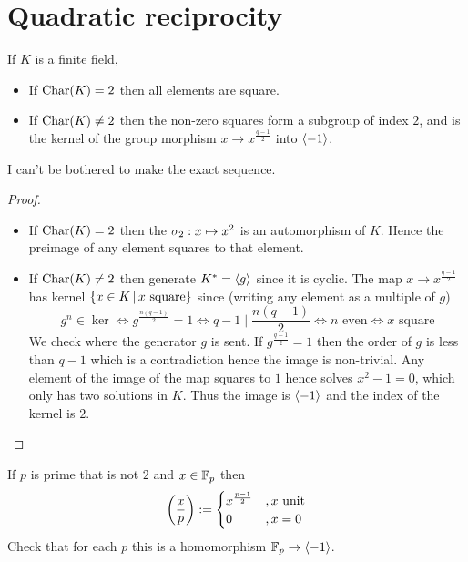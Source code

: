 \section{Quadratic reciprocity}
\begin{prop}
    If $K$ is a finite field,
    \begin{itemize}
        \item If $\mathrm{Char}(K) = 2$ then all elements are square.
        \item If $\mathrm{Char}(K) \ne 2$ 
        then the non-zero squares form a subgroup of index $2$,
        and is the kernel of the group morphism 
        $x \to x^{\frac{q-1}{2}}$ into $\langle-1\rangle$.
    \end{itemize}
    I can't be bothered to make the exact sequence.%
\end{prop}
\begin{proof}~
    \begin{itemize}
        \item If $\mathrm{Char}(K) = 2$ then the 
         $\sigma_2 : x \mapsto x^2$
        is an automorphism of $K$. 
        Hence the preimage of any element squares to that element.
        \item If $\mathrm{Char}(K) \ne 2$ then generate $K^* = \langle g\rangle$ 
        since it is cyclic.
        The map $x \to x^{\frac{q-1}{2}}$ 
        has kernel $\left\{x \in K \,|\, x \text{ square}\right\}$ since
        (writing any element as a multiple of $g$)
        \[
            g^n \in \ker \iff g^\frac{n(q-1)}{2} = 1 \iff 
            q - 1 \mid \frac{n(q - 1)}{2} \iff n \text{ even} 
            \iff x \text{ square}
        \]
        We check where the generator $g$ is sent. 
        If $g^{\frac{q - 1}{2}} = 1$ then the order of $g$ 
        is less than $q - 1$ which is a contradiction
        hence the image is non-trivial.
        Any element of the image of the map squares to $1$
        hence solves $x^2 - 1 = 0$,
        which only has two solutions in $K$.
        Thus the image is $\langle-1\rangle$ and the index of the kernel is $2$.
    \end{itemize}
\end{proof}

\begin{dfn}
    If $p$ is prime that is not $2$ and $x \in \mathbb{F}_p$ then
    \[\left(\frac{x}{p}\right) := 
    \begin{cases}
        x^{\frac{p-1}{2}} &, x \text{ unit}\\
        0 &, x = 0
    \end{cases}\]
    Check that for each $p$ this is a homomorphism $\mathbb{F}_p \to \langle-1\rangle$.
\end{dfn}

